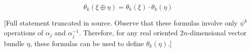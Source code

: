 $$
\theta_k(\xi \oplus \eta) = \theta_k(\xi) \cdot \theta_k(\eta)
$$

[Full statement truncated in source. Observe that these formulas involve only $\psi^k$ operations of $\alpha_j$ and $\alpha_j^{-1}$. Therefore, for any real oriented $2n$-dimensional vector bundle $\eta$, these formulas can be used to define $\theta_k(\eta)$.]
